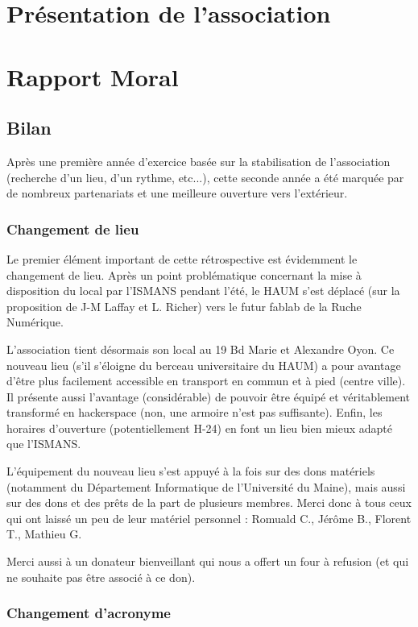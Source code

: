 \documentclass[11pt]{article}
\begin{document}
\section{Présentation de l'association}
\section{Rapport Moral}


\subsection{Bilan}

Après une première année d'exercice basée sur la stabilisation de l'association (recherche d'un lieu, d'un rythme, etc...), cette seconde année a été marquée par de nombreux partenariats et une meilleure ouverture vers l'extérieur.

\subsubsection{Changement de lieu}

Le premier élément important de cette rétrospective est évidemment le changement de lieu.
Après un point problématique concernant la mise à disposition du local par l'ISMANS pendant l'été, le HAUM s'est déplacé (sur la proposition de J-M Laffay et L. Richer) vers le futur fablab de la Ruche Numérique.

L'association tient désormais son local au 19 Bd Marie et Alexandre Oyon. Ce nouveau lieu (s'il s'éloigne du berceau universitaire du HAUM) a pour avantage d'être plus facilement accessible en transport en commun et à pied (centre ville). Il présente aussi l'avantage (considérable) de pouvoir être équipé et véritablement transformé en hackerspace (non, une armoire n'est pas suffisante). Enfin, les horaires d'ouverture (potentiellement H-24) en font un lieu bien mieux adapté que l'ISMANS.

L'équipement du nouveau lieu s'est appuyé à la fois sur des dons matériels (notamment du Département Informatique de l'Université du Maine), mais aussi sur des dons et des prêts de la part de plusieurs membres. Merci donc à tous ceux qui ont laissé un peu de leur matériel personnel : Romuald C., Jérôme B., Florent T., Mathieu G.

Merci aussi à un donateur bienveillant qui nous a offert un four à refusion (et qui ne souhaite pas être associé à ce don).

\subsubsection{Changement d'acronyme}
\end{document}

